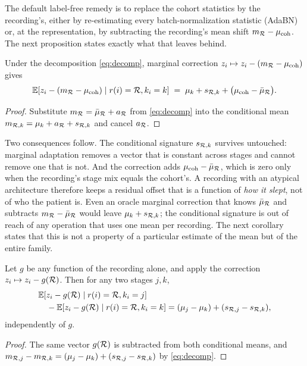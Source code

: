 The default label-free remedy is to replace the cohort statistics by the
recording's, either by re-estimating every batch-normalization statistic
(AdaBN) or, at the representation, by subtracting the recording's mean shift
$m_{\mathcal{R}}-\mu_{\mathrm{coh}}$. The next proposition states exactly what that
leaves behind.

\begin{proposition}
\label{prop:marginal}
Under the decomposition \eqref{eq:decomp}, marginal correction
$z_i\mapsto z_i-(m_{\mathcal{R}}-\mu_{\mathrm{coh}})$ gives
\begin{equation}
  \mathbb{E}\!\left[z_i-(m_{\mathcal{R}}-\mu_{\mathrm{coh}})\mid r(i)=\mathcal{R},k_i=k\right]
  \;=\;\mu_k+s_{\mathcal{R},k}+\bigl(\mu_{\mathrm{coh}}-\bar\mu_{\mathcal{R}}\bigr).
  \label{eq:marginal-residual}
\end{equation}
\end{proposition}
\begin{proof}
Substitute $m_{\mathcal{R}}=\bar\mu_{\mathcal{R}}+a_{\mathcal{R}}$ from \eqref{eq:decomp} into the
conditional mean $m_{\mathcal{R},k}=\mu_k+a_{\mathcal{R}}+s_{\mathcal{R},k}$ and cancel $a_{\mathcal{R}}$.
\end{proof}

Two consequences follow. The conditional signature $s_{\mathcal{R},k}$ survives
untouched: marginal adaptation removes a vector that is constant across stages
and cannot remove one that is not. And the correction adds
$\mu_{\mathrm{coh}}-\bar\mu_{\mathcal{R}}$, which is zero only when the recording's
stage mix equals the cohort's. A recording with an atypical architecture
therefore keeps a residual offset that is a function of \emph{how it slept},
not of who the patient is. Even an oracle marginal correction that knows
$\bar\mu_{\mathcal{R}}$ and subtracts $m_{\mathcal{R}}-\bar\mu_{\mathcal{R}}$ would leave
$\mu_k+s_{\mathcal{R},k}$; the conditional signature is out of reach of any operation
that uses one mean per recording. The next corollary states that this is not a
property of a particular estimate of the mean but of the entire family.

\begin{corollary}
\label{cor:no-marginal}
Let $g$ be any function of the recording alone, and apply the correction
$z_i\mapsto z_i-g(\mathcal{R})$. Then for any two stages $j,k$,
\begin{equation}
\begin{aligned}
  &\mathbb{E}\!\left[z_i-g(\mathcal{R})\mid r(i)=\mathcal{R},k_i=j\right] \\
  &\quad-\mathbb{E}\!\left[z_i-g(\mathcal{R})\mid r(i)=\mathcal{R},k_i=k\right]
  =(\mu_j-\mu_k)+(s_{\mathcal{R},j}-s_{\mathcal{R},k}),
\end{aligned}
  \label{eq:invariant}
\end{equation}
independently of $g$.
\end{corollary}
\begin{proof}
The same vector $g(\mathcal{R})$ is subtracted from both conditional means, and
$m_{\mathcal{R},j}-m_{\mathcal{R},k}=(\mu_j-\mu_k)+(s_{\mathcal{R},j}-s_{\mathcal{R},k})$ by
\eqref{eq:decomp}.
\end{proof}

